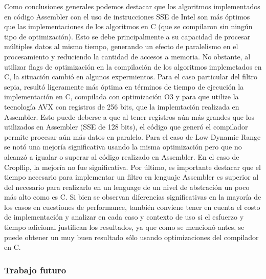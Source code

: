 \documentclass[a4paper]{article}
\begin{document}
Como conclusiones generales podemos destacar que los algoritmos implementados
en código Assembler con el uso de instrucciones SSE de Intel son más óptimos que
las implementaciones de los algoritmos en C (que se compilaron sin ningún 
tipo de optimización). Esto se debe principalmente a
su capacidad de procesar múltiples datos al mismo tiempo, generando un efecto
de paralelismo en el procesamiento y reduciendo la cantidad de accesos a memoria.
No obstante, al utilizar flags de optimización en la compilación de los algoritmos
implemetados en C, la situación cambió en algunos expermientos. Para el caso particular del filtro sepia, resultó ligeramente más óptima en términos de tiempo de ejecución
la implementación en C, compilada con optimización O3 y para que utilize la tecnología AVX con registros de 256 bits, que la implemtación realizada en Assembler. Esto puede deberse a que al tener registros aún más grandes que los utilizados en Assembler (SSE de 128 bits), el código que generó el compilador permite procesar aún más datos en paralelo. 
Para el caso de Low Dynamic Range se notó una mejoría significativa usando la misma optimización pero que no alcanzó a igualar o superar al código realizado en Assembler. En el caso de Cropflip, la mejoría no fue significativa.
Por último, es importante destacar que el tiempo necesario para implementar un filtro en lenguaje Assembler es superior al del necesario para realizarlo en un lenguage de un nivel de abstración un poco más alto como es C. Si bien se observan diferencias significativas en la mayoría de los casos en cuestiones de performance, también conviene tener en cuenta el costo de implementación y analizar en cada caso y contexto de uso si el esfuerzo y tiempo adicional justifican los resultados, ya que como se mencionó antes, se puede obtener un muy buen resultado sólo usando optimizaciones del compilador en C.   

\subsubsection{Trabajo futuro}
\end{document}
